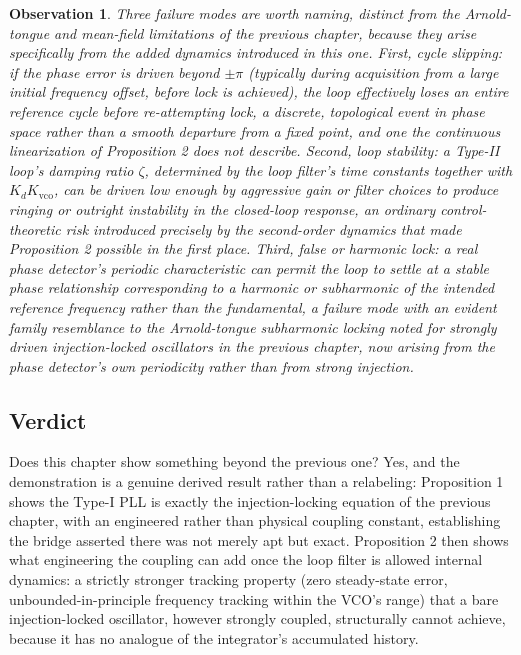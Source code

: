 \documentclass[12pt]{article}
\newtheorem{observation}{Observation}
\begin{document}
\begin{observation}
Three failure modes are worth naming, distinct from the Arnold-tongue and mean-field limitations of the previous chapter, because they arise specifically from the added dynamics introduced in this one. First, cycle slipping: if the phase error is driven beyond $\pm\pi$ (typically during acquisition from a large initial frequency offset, before lock is achieved), the loop effectively loses an entire reference cycle before re-attempting lock, a discrete, topological event in phase space rather than a smooth departure from a fixed point, and one the continuous linearization of Proposition 2 does not describe. Second, loop stability: a Type-II loop's damping ratio $\zeta$, determined by the loop filter's time constants together with $K_dK_{\text{vco}}$, can be driven low enough by aggressive gain or filter choices to produce ringing or outright instability in the closed-loop response, an ordinary control-theoretic risk introduced precisely by the second-order dynamics that made Proposition 2 possible in the first place. Third, false or harmonic lock: a real phase detector's periodic characteristic can permit the loop to settle at a stable phase relationship corresponding to a harmonic or subharmonic of the intended reference frequency rather than the fundamental, a failure mode with an evident family resemblance to the Arnold-tongue subharmonic locking noted for strongly driven injection-locked oscillators in the previous chapter, now arising from the phase detector's own periodicity rather than from strong injection.
\end{observation}

\subsection{Verdict}

Does this chapter show something beyond the previous one? Yes, and the demonstration is a genuine derived result rather than a relabeling: Proposition 1 shows the Type-I PLL is exactly the injection-locking equation of the previous chapter, with an engineered rather than physical coupling constant, establishing the bridge asserted there was not merely apt but exact. Proposition 2 then shows what engineering the coupling can add once the loop filter is allowed internal dynamics: a strictly stronger tracking property (zero steady-state error, unbounded-in-principle frequency tracking within the VCO's range) that a bare injection-locked oscillator, however strongly coupled, structurally cannot achieve, because it has no analogue of the integrator's accumulated history.
\end{document}
